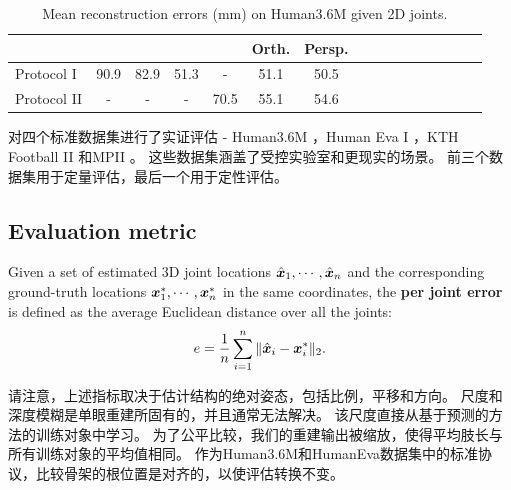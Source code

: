 
\begin{table}
\caption{Mean reconstruction errors (mm) on Human3.6M \cite{ionescu2014human} given 2D joints.}\label{tab:nrsfm}
\centering
\renewcommand{\arraystretch}{1.5}
\begin{tabular}{l*{15}{c}}
\toprule
 & \cite{ramakrishna2012reconstructing} &  \cite{dai2012simple} & \cite{zhou2015sparse} & \cite{yasin2016dual} & Orth. & Persp. \\
\toprule
Protocol I & 90.9 & 82.9 & 51.3 & - & 51.1 & 50.5 \\
Protocol II & - & - & - & 70.5 & 55.1 & 54.6 \\
\toprule
\end{tabular}
\end{table}

对四个标准数据集进行了实证评估 -  Human3.6M \cite{ionescu2014human}，Human Eva I \cite{sigal2010humaneva}，KTH Football II \cite{kazemi2013multi}和MPII \cite{andriluka14cvpr}。 这些数据集涵盖了受控实验室和更现实的场景。 前三个数据集用于定量评估，最后一个用于定性评估。
\subsection{Evaluation metric} %
\label{sub:evaluation_metric}

Given a set of estimated 3D joint locations $\hat{{\bm{x}}}_1,\cdots,\hat{{\bm{x}}}_n$ and the corresponding ground-truth locations ${\bm{x}}_1^*,\cdots,{\bm{x}}_n^*$ in the same coordinates, the \textbf{per joint error} is defined as the average Euclidean distance over all the joints:
\begin{align}\label{eq:pje}
e = \frac{1}{n}\sum_{i=1}^n\|\hat{{\bm{x}}}_i-{\bm{x}}_i^*\|_2.
\end{align}

请注意，上述指标取决于估计结构的绝对姿态，包括比例，平移和方向。 尺度和深度模糊是单眼重建所固有的，并且通常无法解决。 该尺度直接从基于预测的方法的训练对象中学习\cite{ionescu2014human,li2015maximum,tekin2015predicting}。 为了公平比较，我们的重建输出被缩放，使得平均肢长与所有训练对象的平均值相同。 作为Human3.6M和HumanEva数据集中的标准协议，比较骨架的根位置是对齐的，以使评估转换不变。 %

